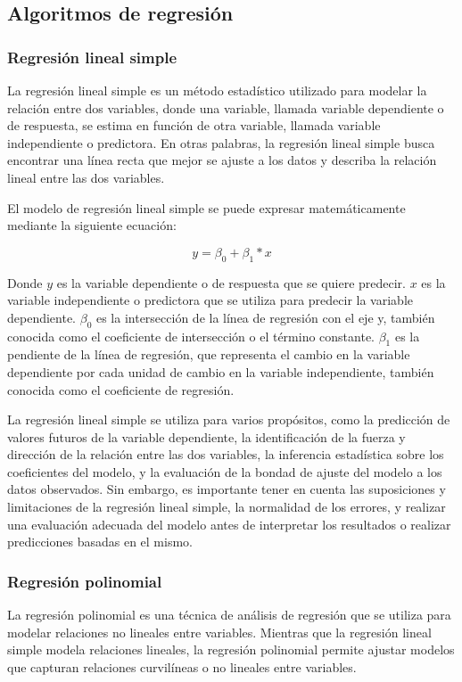 \subsection{Algoritmos de regresión}
\subsubsection{Regresión lineal simple}
La regresión lineal simple es un método estadístico utilizado para modelar la relación entre dos variables, donde una variable, llamada variable dependiente o de respuesta, se estima en función de otra variable, llamada variable independiente o predictora. En otras palabras, la regresión lineal simple busca encontrar una línea recta que mejor se ajuste a los datos y describa la relación lineal entre las dos variables.

El modelo de regresión lineal simple se puede expresar matemáticamente mediante la siguiente ecuación:

$$y = \beta_{0} + \beta_{1} * x$$

Donde $y$ es la variable dependiente o de respuesta que se quiere predecir. $x$ es la variable independiente o predictora que se utiliza para predecir la variable dependiente. $\beta_{0}$ es la intersección de la línea de regresión con el eje y, también conocida como el coeficiente de intersección o el término constante. $\beta_{1}$ es la pendiente de la línea de regresión, que representa el cambio en la variable dependiente por cada unidad de cambio en la variable independiente, también conocida como el coeficiente de regresión.

La regresión lineal simple se utiliza para varios propósitos, como la predicción de valores futuros de la variable dependiente, la identificación de la fuerza y dirección de la relación entre las dos variables, la inferencia estadística sobre los coeficientes del modelo, y la evaluación de la bondad de ajuste del modelo a los datos observados. Sin embargo, es importante tener en cuenta las suposiciones y limitaciones de la regresión lineal simple, la normalidad de los errores, y realizar una evaluación adecuada del modelo antes de interpretar los resultados o realizar predicciones basadas en el mismo.


\subsubsection{Regresión polinomial}
La regresión polinomial es una técnica de análisis de regresión que se utiliza para modelar relaciones no lineales entre variables. Mientras que la regresión lineal simple modela relaciones lineales, la regresión polinomial permite ajustar modelos que capturan relaciones curvilíneas o no lineales entre variables.

